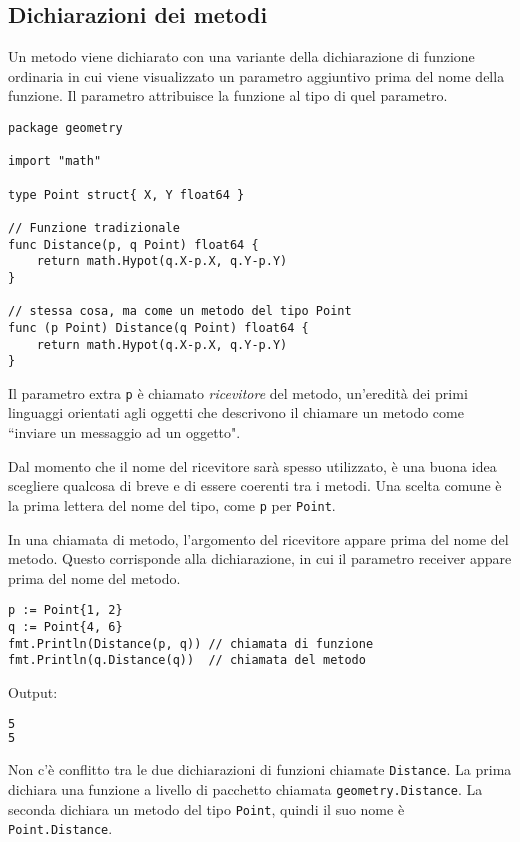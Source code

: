 \documentclass[../../thesis.tex]{subfiles}
\begin{document}
    \subsection{Dichiarazioni dei metodi}\label{subsec:dichiarazioni-dei-metodi}
    Un metodo viene dichiarato con una variante della dichiarazione di funzione ordinaria in cui viene visualizzato un parametro aggiuntivo prima del nome della funzione.
    Il parametro attribuisce la funzione al tipo di quel parametro.
    \begin{lstlisting}[frame = single,label={lst:lstlisting5-1.1}]
package geometry

import "math"

type Point struct{ X, Y float64 }

// Funzione tradizionale
func Distance(p, q Point) float64 {
    return math.Hypot(q.X-p.X, q.Y-p.Y)
}

// stessa cosa, ma come un metodo del tipo Point
func (p Point) Distance(q Point) float64 {
    return math.Hypot(q.X-p.X, q.Y-p.Y)
}
    \end{lstlisting}
    Il parametro extra \verb"p" è chiamato \textit{ricevitore} del metodo, un'eredità dei primi linguaggi orientati agli oggetti che descrivono il chiamare un metodo come ``inviare un messaggio ad un oggetto".
    \hfill \vspace{12pt}

    Dal momento che il nome del ricevitore sarà spesso utilizzato, è una buona idea scegliere qualcosa di breve e di essere coerenti tra i metodi.
    Una scelta comune è la prima lettera del nome del tipo, come \verb"p" per \verb"Point".
    \hfill \vspace{12pt}

    In una chiamata di metodo, l'argomento del ricevitore appare prima del nome del metodo.
    Questo corrisponde alla dichiarazione, in cui il parametro receiver appare prima del nome del metodo.
    \begin{lstlisting}[frame = single,label={lst:lstlisting5-1.2}]
p := Point{1, 2}
q := Point{4, 6}
fmt.Println(Distance(p, q)) // chiamata di funzione
fmt.Println(q.Distance(q))  // chiamata del metodo
    \end{lstlisting}
    Output:
    \begin{lstlisting}[language = bash, frame = L,label={lst:lstlisting5-1.3}]
5
5
    \end{lstlisting}
    Non c'è conflitto tra le due dichiarazioni di funzioni chiamate \verb"Distance".
    La prima dichiara una funzione a livello di pacchetto chiamata \verb"geometry.Distance".
    La seconda dichiara un metodo del tipo \verb"Point", quindi il suo nome è \verb"Point.Distance".
    \hfill \vspace{12pt}
\end{document}
